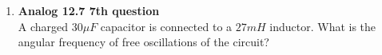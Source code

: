 \documentclass{article}
\begin{document}
\begin{enumerate}
    
     \item \textbf{Analog 12.7 7th question}\\
          A charged \(30 \mu F\) capacitor is connected to a \(27 mH\) inductor. What is the angular frequency of free oscillations of the circuit?

  \end{enumerate}
  
\end{document}
